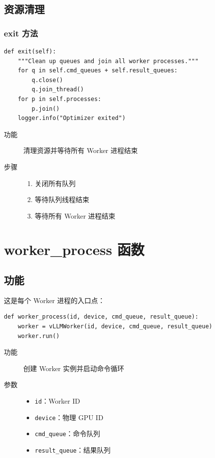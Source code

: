 \documentclass[12pt,a4paper]{article}
\begin{document}
\subsection{资源清理}

\subsubsection{exit 方法}

\begin{lstlisting}
def exit(self):
    """Clean up queues and join all worker processes."""
    for q in self.cmd_queues + self.result_queues:
        q.close()
        q.join_thread()
    for p in self.processes:
        p.join()
    logger.info("Optimizer exited")
\end{lstlisting}

\begin{description}
    \item[功能] 清理资源并等待所有 Worker 进程结束
    \item[步骤]
    \begin{enumerate}
        \item 关闭所有队列
        \item 等待队列线程结束
        \item 等待所有 Worker 进程结束
    \end{enumerate}
\end{description}

\section{worker\_process 函数}

\subsection{功能}

这是每个 Worker 进程的入口点：

\begin{lstlisting}
def worker_process(id, device, cmd_queue, result_queue):
    worker = vLLMWorker(id, device, cmd_queue, result_queue)
    worker.run()
\end{lstlisting}

\begin{description}
    \item[功能] 创建 Worker 实例并启动命令循环
    \item[参数]
    \begin{itemize}
        \item \texttt{id}：Worker ID
        \item \texttt{device}：物理 GPU ID
        \item \texttt{cmd\_queue}：命令队列
        \item \texttt{result\_queue}：结果队列
    \end{itemize}
\end{description}
\end{document}
